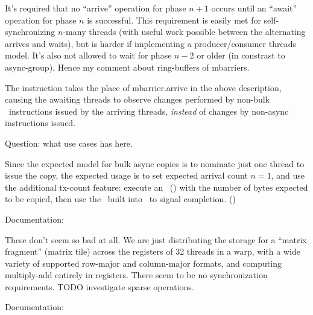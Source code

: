 \filbreak
It's required that no ``arrive'' operation for phase $n+1$ occurs until an ``await'' operation for phase $n$ is successful.
This requirement is easily met for self-synchronizing $n$-many threads (with useful work possible between the alternating arrives and waits), but is harder if implementing a producer/consumer threads model.
It's also not allowed to wait for phase $n-2$ or older (in constrast to async-group).
Hence my comment about ring-buffers of mbarriers.

\filbreak
{} The  instruction takes the place of mbarrier.arrive in the above description, causing the awaiting threads to observe changes performed by non-bulk \cpAsync\ instructions issued by the arriving threads, \textit{instead} of changes by non-async instructions issued.

Question: what use cases  has here.

\filbreak
{} Since the expected model for bulk async copies is to nominate just one thread to issue the copy, the expected usage is to set expected arrival count $n = 1$, and use the additional tx-count feature: execute an \expectTxOperation\ () with the number of bytes expected to be copied, then use the \completeTxOperation\ built into \cpAsyncBulk\ to signal completion. ()

\filbreak
{}

Documentation: 

These don't seem so bad at all. We are just distributing the storage for a ``matrix fragment'' (matrix tile) across the registers of 32 threads in a warp, with a wide variety of supported row-major and column-major formats, and computing multiply-add entirely in registers. There seem to be no synchronization requirements. TODO investigate sparse operations.

\filbreak
{}

Documentation: 

